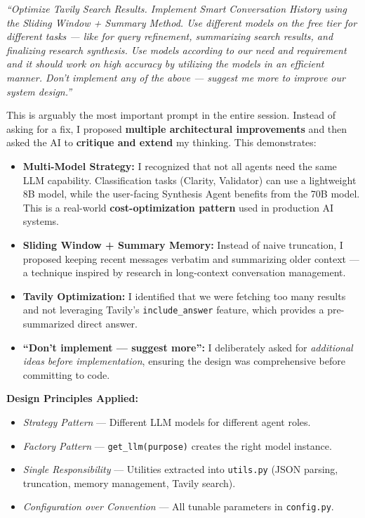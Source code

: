 \documentclass[12pt, a4paper]{article}
\begin{document}
\begin{promptbox}
\textit{``Optimize Tavily Search Results. Implement Smart Conversation History using the Sliding Window + Summary Method. Use different models on the free tier for different tasks — like for query refinement, summarizing search results, and finalizing research synthesis. Use models according to our need and requirement and it should work on high accuracy by utilizing the models in an efficient manner. Don't implement any of the above — suggest me more to improve our system design.''}
\end{promptbox}

\begin{reasonbox}
This is arguably the most important prompt in the entire session. Instead of asking for a fix, I proposed \textbf{multiple architectural improvements} and then asked the AI to \textbf{critique and extend} my thinking. This demonstrates:

\begin{itemize}[leftmargin=1.5em]
    \item \textbf{Multi-Model Strategy:} I recognized that not all agents need the same LLM capability. Classification tasks (Clarity, Validator) can use a lightweight 8B model, while the user-facing Synthesis Agent benefits from the 70B model. This is a real-world \textbf{cost-optimization pattern} used in production AI systems.
    \item \textbf{Sliding Window + Summary Memory:} Instead of naive truncation, I proposed keeping recent messages verbatim and summarizing older context — a technique inspired by research in long-context conversation management.
    \item \textbf{Tavily Optimization:} I identified that we were fetching too many results and not leveraging Tavily's \texttt{include\_answer} feature, which provides a pre-summarized direct answer.
    \item \textbf{``Don't implement — suggest more'':} I deliberately asked for \textit{additional ideas before implementation}, ensuring the design was comprehensive before committing to code.
\end{itemize}

\textbf{Design Principles Applied:}
\begin{itemize}[leftmargin=1.5em]
    \item \textit{Strategy Pattern} — Different LLM models for different agent roles.
    \item \textit{Factory Pattern} — \texttt{get\_llm(purpose)} creates the right model instance.
    \item \textit{Single Responsibility} — Utilities extracted into \texttt{utils.py} (JSON parsing, truncation, memory management, Tavily search).
    \item \textit{Configuration over Convention} — All tunable parameters in \texttt{config.py}.
\end{itemize}
\end{reasonbox}
\end{document}
